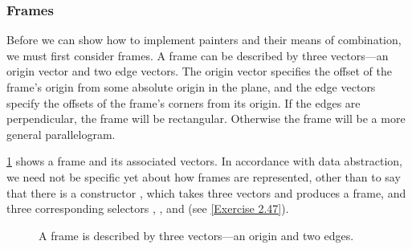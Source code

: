 \subsubsection*{Frames}

Before we can show how to implement painters and their means of combination, we must first consider frames.
A frame can be described by three vectors---an origin vector and two edge vectors.
The origin vector specifies the offset of the frame’s origin from some absolute origin in the plane, and the edge vectors specify the offsets of the frame’s corners from its origin.
If the edges are perpendicular, the frame will be rectangular.
Otherwise the frame will be a more general parallelogram.

\cref{Figure 2.15} shows a frame and its associated vectors.
In accordance with data abstraction, we need not be specific yet about how frames are represented, other than to say that there is a constructor , which takes three vectors and produces a frame, and three corresponding selectors , , and  (see \cref{Exercise 2.47}).

\begin{figure}[tb]
	\centering
	
	\caption{
		A frame is described by three vectors---an origin and two edges.
	}
	\label{Figure 2.15}
\end{figure}

